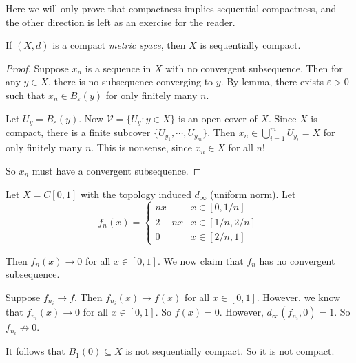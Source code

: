 \documentclass[a4paper]{article}
\begin{document}
Here we will only prove that compactness implies sequential compactness, and the other direction is left as an exercise for the reader.
\begin{thm}
  If $(X, d)$ is a compact \emph{metric space}, then $X$ is sequentially compact.
\end{thm}

\begin{proof}
  Suppose $x_n$ is a sequence in $X$ with no convergent subsequence. Then for any $y\in X$, there is no subsequence converging to $y$. By lemma, there exists $\varepsilon > 0$ such that $x_n\in B_\varepsilon (y)$ for only finitely many $n$.

  Let $U_y = B_\varepsilon (y)$. Now $\mathcal{V} = \{U_y: y\in X\}$ is an open cover of $X$. Since $X$ is compact, there is a finite subcover $\{U_{y_1}, \cdots, U_{y_m}\}$. Then $x_n \in \bigcup_{i = 1}^m U_{y_i} = X$ for only finitely many $n$. This is nonsense, since $x_n \in X$ for all $n$!

  So $x_n$ must have a convergent subsequence.
\end{proof}

\begin{eg}
  Let $X = C[0, 1]$ with the topology induced $d_\infty$ (uniform norm). Let
  \[
    f_n(x) =
    \begin{cases}
      nx & x\in [0, 1/n]\\
      2 - nx & x\in [1/n, 2/n]\\
      0 & x \in [2/n, 1]
    \end{cases}
  \]
  \begin{center}
  \end{center}
  Then $f_n(x) \to 0$ for all $x\in [0, 1]$. We now claim that $f_n$ has no convergent subsequence.

  Suppose $f_{n_i} \to f$. Then $f_{n_i}(x) \to f(x)$ for all $x\in [0, 1]$. However, we know that $f_{n_i}(x) \to 0$ for all $x\in [0, 1]$. So $f(x) = 0$. However, $d_{\infty}(f_{n_i}, 0) = 1$. So $f_{n_i}\not \to 0$.

  It follows that $B_1(0)\subseteq X$ is not sequentially compact. So it is not compact.
\end{eg}
\end{document}
